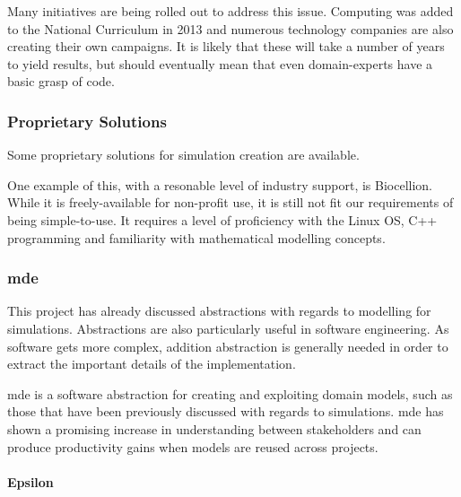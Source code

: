 \documentclass{UoYCSproject}
\begin{document}

Many initiatives are being rolled out to address this issue.
Computing was added to the National Curriculum in 2013\cite{national_curriculum, teacher_training} and numerous technology companies are also creating their own campaigns\cite{apple_education, microsoft_education}.
It is likely that these will take a number of years to yield results, but should eventually mean that even domain-experts have a basic grasp of code.

\subsubsection{Proprietary Solutions}
Some proprietary solutions for simulation creation are available.

One example of this, with a resonable level of industry support, is Biocellion.
While it is freely-available for non-profit use, it is still not fit our requirements of being simple-to-use.
It requires a level of proficiency with the Linux OS, C++ programming and familiarity with mathematical modelling concepts.
\cite{biocellion}

\subsubsection{\acrlong{mde}}
This project has already discussed abstractions with regards to modelling for simulations.
Abstractions are also particularly useful in software engineering.
As software gets more complex, addition abstraction is generally needed in order to extract the important details of the implementation\cite[p.24]{csapp}.

\acrshort{mde} is a software abstraction for creating and exploiting domain models, such as those that have been previously discussed with regards to simulations.
\acrshort{mde} has shown a promising increase in understanding between stakeholders and can produce productivity gains when models are reused across projects\cite{mde_industry_review}.

\paragraph{Epsilon}
\end{document}
